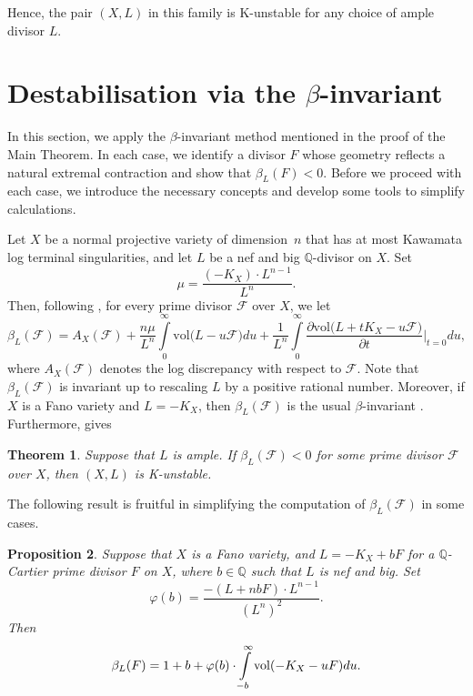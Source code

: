 \documentclass[12pt]{amsart}
\newtheorem{theorem}{Theorem}
\newtheorem{proposition}[theorem]{Proposition}
\theoremstyle{definition}
\theoremstyle{remark}
\begin{document}
Hence, the pair $(X,L)$ in this family is K-unstable for any choice of ample divisor $L$.


\section{Destabilisation via the $\beta$-invariant}
\label{section:beta}
In this section, we apply the $\beta$-invariant method mentioned in the proof of the Main Theorem.
In each case, we identify a divisor $F$ whose geometry reflects a natural extremal contraction and show that $\beta_L(F) < 0$.
Before we proceed with each case, we introduce the necessary concepts and develop some tools to simplify calculations.

Let $X$ be a normal projective variety of dimension~$n$ that has at most Kawamata log terminal singularities, and let $L$ be a nef and big $\mathbb{Q}$-divisor on $X$. Set
$$
\mu=\frac{(-K_X)\cdot L^{n-1}}{L^n}.
$$
Then, following \cite{DervanLegendre}, for every prime divisor $\mathscr{F}$ over $X$, we let
\begin{equation}
\label{equation:beta}\tag{$\bigstar$}
\beta_L(\mathscr{F})=A_X(\mathscr{F})+\frac{n\mu}{L^n}\int\limits_{0}^{\infty}\mathrm{vol}\big(L-u\mathscr{F}\big)du+
\frac{1}{L^n}\int\limits_{0}^{\infty}\frac{\partial \mathrm{vol}\big(L+tK_X-u\mathscr{F}\big)}{\partial t}\Big\vert_{t=0}du,
\end{equation}
where $A_X(\mathscr{F})$ denotes the log discrepancy with respect to $\mathscr{F}$.
Note that $\beta_L(\mathscr{F})$ is invariant up to rescaling $L$ by a positive rational number. Moreover, if $X$ is a Fano variety and $L=-K_X$, then $\beta_L(\mathscr{F})$ is the usual $\beta$-invariant \cite{DervanLegendre,Fujita2019}. Furthermore, \cite[Theorem~1.1]{DervanLegendre} gives

\begin{theorem}
\label{theorem:DervanLegendre}
Suppose that $L$ is ample. If $\beta_L(\mathscr{F})<0$ for some prime divisor $\mathscr{F}$ over $X$, then $(X,L)$ is K-unstable.
\end{theorem}



The following result is fruitful in simplifying the computation of $\beta_L(\mathscr{F})$ in some cases.

\begin{proposition}
\label{proposition:Paolo-1}
Suppose that $X$ is a Fano variety, and $L=-K_X+bF$ for a $\mathbb Q$-Cartier prime divisor $F$ on $X$, where $b\in \mathbb Q$ such that $L$ is nef and big. Set
$$
\varphi(b)=\frac{-(L+nbF)\cdot L^{n-1}}{(L^n)^2}.
$$
Then
$$
\beta_L(F)=1+b+\varphi(b)\cdot \int\limits_{-b}^{\infty}{\rm vol}(-K_X-uF)du.
$$
\end{proposition}
\end{document}
